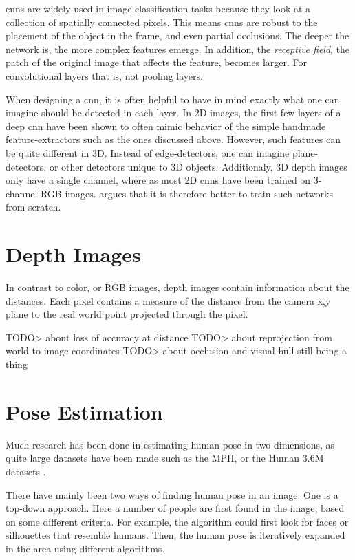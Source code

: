 \gls{cnn}s are widely used in image classification tasks because they look at a collection of spatially connected pixels. This means \gls{cnn}s are robust to the placement of the object in the frame, and even partial occlusions. The deeper the network is, the more complex features emerge. In addition, the \emph{receptive field}, the patch of the original image that affects the feature, becomes larger. For convolutional layers that is, not pooling layers.

When designing a \gls{cnn}, it is often helpful to have in mind exactly what one can imagine should be detected in each layer. In 2D images, the first few layers of a deep \gls{cnn} have been shown to often mimic behavior of the simple handmade feature-extractors such as the ones discussed above. However, such features can be quite different in 3D. Instead of edge-detectors, one can imagine plane-detectors, or other detectors unique to 3D objects. Additionaly, 3D depth images only have a single channel, where as most 2D \gls{cnn}s have been trained on 3-channel RGB images. \cite{song2018depth} argues that it is therefore better to train such networks from scratch.


\section{Depth Images}
In contrast to color, or RGB images, depth images contain information about the distances. Each pixel contains a measure of the distance from the camera x,y plane to the real world point projected through the pixel.

TODO> about loss of accuracy at distance
TODO> about reprojection from world to image-coordinates
TODO> about occlusion and visual hull still being a thing


\section{Pose Estimation}
Much research has been done in estimating human pose in two dimensions, as quite large datasets have been made such as the MPII, or the Human 3.6M datasets \cite{andriluka14cvpr,h36m_pami}.

There have mainly been two ways of finding human pose in an image. One is a top-down approach. Here a number of people are first found in the image, based on some different criteria. For example, the algorithm could first look for faces or silhouettes that resemble humans. Then, the human pose is iteratively expanded in the area using different algorithms.

